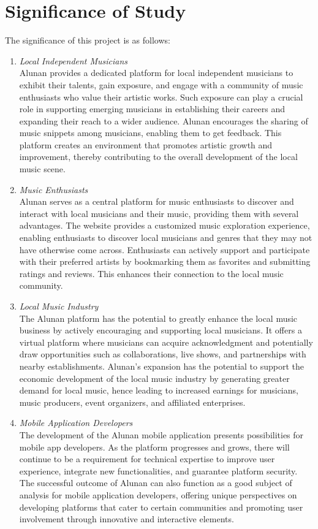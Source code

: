 \section{Significance of Study}
The significance of this project is as follows:
\begin{enumerate}[1.]
    \item \textit{Local Independent Musicians} \\
    Alunan provides a dedicated platform for local independent musicians to exhibit their talents, gain exposure, and engage with a community of music enthusiasts who value their artistic works. Such exposure can play a crucial role in supporting emerging musicians in establishing their careers and expanding their reach to a wider audience. Alunan encourages the sharing of music snippets among musicians, enabling them to get feedback. This platform creates an environment that promotes artistic growth and improvement, thereby contributing to the overall development of the local music scene.
    \item \textit{Music Enthusiasts} \\
    Alunan serves as a central platform for music enthusiasts to discover and interact with local musicians and their music, providing them with several advantages. The website provides a customized music exploration experience, enabling enthusiasts to discover local musicians and genres that they may not have otherwise come across. Enthusiasts can actively support and participate with their preferred artists by bookmarking them as favorites and submitting ratings and reviews. This enhances their connection to the local music community.
    \item \textit{Local Music Industry} \\
    The Alunan platform has the potential to greatly enhance the local music business by actively encouraging and supporting local musicians. It offers a virtual platform where musicians can acquire acknowledgment and potentially draw opportunities such as collaborations, live shows, and partnerships with nearby establishments. Alunan's expansion has the potential to support the economic development of the local music industry by generating greater demand for local music, hence leading to increased earnings for musicians, music producers, event organizers, and affiliated enterprises. \pagebreak
    \item \textit{Mobile Application Developers} \\
    The development of the Alunan mobile application presents possibilities for mobile app developers. As the platform progresses and grows, there will continue to be a requirement for technical expertise to improve user experience, integrate new functionalities, and guarantee platform security. The successful outcome of Alunan can also function as a good subject of analysis for mobile application developers, offering unique perspectives on developing platforms that cater to certain communities and promoting user involvement through innovative and interactive elements.
\end{enumerate}

